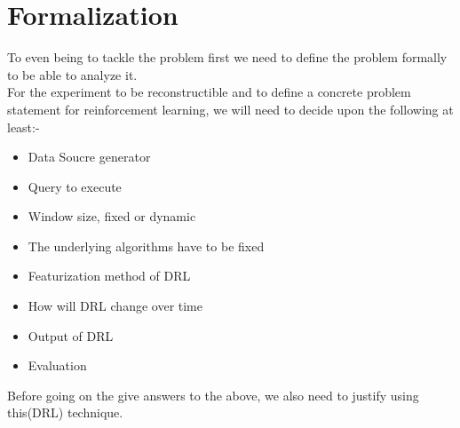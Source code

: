 \section{Formalization}
To even being to tackle the problem first we need to define the problem formally to be able to analyze it.
\\ For the experiment to be reconstructible and to define a concrete problem statement for reinforcement learning, we will need to decide upon the following at least:-
\begin{itemize}
    \item Data Soucre generator
    \item Query to execute
    \item Window size, fixed or dynamic
    \item The underlying algorithms have to be fixed
    \item Featurization method of DRL
    \item How will DRL change over time
    \item Output of DRL
    \item Evaluation
\end{itemize}
Before going on the give answers to the above, we also need to justify using this(DRL) technique.


